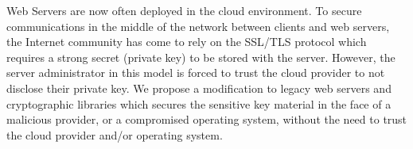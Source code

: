 \documentclass[../main.tex]{subfiles}
\begin{document}
   

\noindent 
Web Servers are now often deployed in the cloud environment. To
secure communications in the middle of the network between clients and web
servers, the Internet community has come to rely on the SSL/TLS protocol which
requires a strong secret (private key) to be stored with the server. However,
the server administrator in this model is forced to trust the cloud provider
to not disclose their private key. We propose a modification to legacy web
servers and cryptographic libraries which secures the sensitive key material
in the face of a malicious provider, or a compromised operating system, without
the need to trust the cloud provider and/or operating system.
\end{document}
